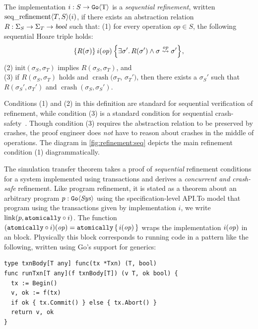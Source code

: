 \begin{definition}
  The implementation $i : S \to \mathtt{Go}\langle \mathrm{T} \rangle$ is a \emph{sequential
    refinement}, written
  $\operatorname{seq\_refinement} \langle T, S \rangle(i)$, if there exists an abstraction relation
  $R : \Sigma_{S} \to \Sigma_{T} \to \textit{bool}$ such that: \newline
(1) for every operation
  $op \in S$, the following sequential Hoare triple holds:
  \[
    \hoare{R(\sigma)}{i(\opv)}{\exists \sigma'.\, R(\sigma') \land \sigma \overset{\opv}{\leadsto} \sigma'},
  \]
(2) $\mathrm{init}(\sigma_{S}, \sigma_{T})$ implies
$R(\sigma_{S}, \sigma_{T})$, and \\
(3) if $R(\sigma_{S}, \sigma_{T})$ holds and $\operatorname{crash}(\sigma_{T}$, $\sigma_{T}')$,
then there exists a $\sigma_{S}'$ such that $R(\sigma_{S}', \sigma_{T}')$ and
$\operatorname{crash}(\sigma_{S}, \sigma_{S}')$.%
  \label{def:seqrefinement}
\end{definition}
%
Conditions (1) and (2) in this definition are standard for sequential
verification of refinement, while condition (3) is a standard condition for sequential crash-safety~\citep{chajed:argosy}. Though condition (3) requires the
abstraction relation to be preserved by crashes, the proof engineer does \emph{not} have to reason about crashes in the middle of operations.
The
diagram in \cref{fig:refinement:seq} depicts the main
refinement condition (1) diagrammatically.

The simulation transfer theorem takes a proof of \emph{sequential} refinement
conditions for a system implemented using transactions and derives a
\emph{concurrent and crash-safe} refinement. Like program refinement, it is
stated as a theorem about an arbitrary program $p : \mathtt{Go}\langle \mathit{Sys} \rangle$ using
the specification-level API.\@ To model that program using the transactions given
by implementation $i$, we write $\mathrm{link}(p, \mathtt{atomically}\circ i)$. The function
$(\mathtt{atomically}\circ i)(\mathit{op}) = \mathtt{atomically}\,\{\, i(\mathit{op}) \,\}$ wraps the implementation
$i(\mathit{op})$ in an  block. Physically this  block
corresponds to running code in a pattern like the following, written using Go's
support for generics:
%
\begin{verbatim}
type txnBody[T any] func(tx *Txn) (T, bool)
func runTxn[T any](f txnBody[T]) (v T, ok bool) {
  tx := Begin()
  v, ok := f(tx)
  if ok { tx.Commit() } else { tx.Abort() }
  return v, ok
}
\end{verbatim}


